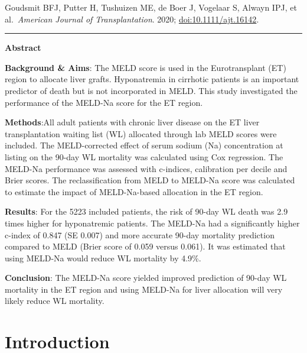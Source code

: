 \documentclass[11pt,english,]{book} %
\begin{document}

\vspace*{\fill}

\noindent Goudsmit BFJ, Putter H, Tushuizen ME, de Boer J, Vogelaar S, Alwayn IPJ, et al.~\emph{American Journal of Transplantation}. 2020; \url{doi:10.1111/ajt.16142}.

\begin{center}\rule{0.5\linewidth}{0.5pt}\end{center}

\newpage
\nopagecolor
\color{black}

\noindent   
\small

\textbf{Abstract}

\textbf{Background \& Aims}: The MELD score is used in the Eurotransplant (ET) region to allocate liver grafts. Hyponatremia in cirrhotic patients is an important predictor of death but is not incorporated in MELD. This study investigated the performance of the MELD-Na score for the ET region.

\textbf{Methods}:All adult patients with chronic liver disease on the ET liver transplantation waiting list (WL) allocated through lab MELD scores were included. The MELD-corrected effect of serum sodium (Na) concentration at listing on the 90-day WL mortality was calculated using Cox regression. The MELD-Na performance was assessed with c-indices, calibration per decile and Brier scores. The reclassification from MELD to MELD-Na score was calculated to estimate the impact of MELD-Na-based allocation in the ET region.

\textbf{Results}: For the 5223 included patients, the risk of 90-day WL death was 2.9 times higher for hyponatremic patients. The MELD-Na had a significantly higher c-index of 0.847 (SE 0.007) and more accurate 90-day mortality prediction compared to MELD (Brier score of 0.059 versus 0.061). It was estimated that using MELD-Na would reduce WL mortality by 4.9\%.

\textbf{Conclusion}: The MELD-Na score yielded improved prediction of 90-day WL mortality in the ET region and using MELD-Na for liver allocation will very likely reduce WL mortality.

\newpage
\normalsize

\hypertarget{introduction}{%
\section*{Introduction}\label{introduction}}
\end{document}
